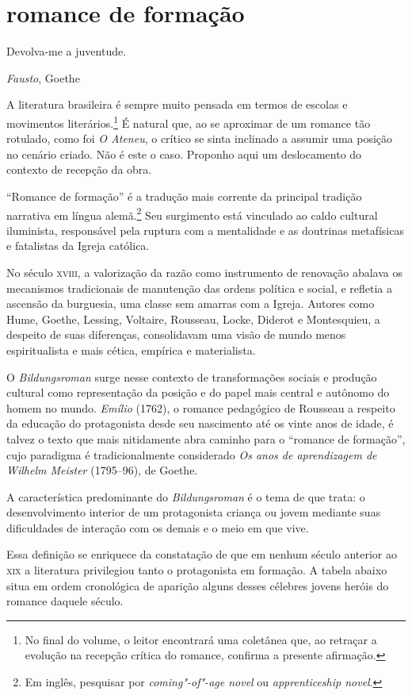 \section*{romance de formação}

\epigraph{Devolva-me a juventude.}{\textit{Fausto}, Goethe}

A literatura brasileira é sempre muito pensada em termos
de escolas e movimentos literários.\footnote{ No final do volume, o
leitor encontrará uma coletânea que, ao retraçar a evolução na recepção
crítica do romance, confirma a presente afirmação.} É
natural que, ao se aproximar de um romance tão rotulado, como foi
\textit{O Ateneu}, o crítico se sinta
inclinado a assumir uma posição no cenário criado. Não é este o caso.
Proponho aqui um deslocamento do contexto de recepção da obra.

``Romance de formação'' é a tradução mais corrente da
principal tradição narrativa em língua alemã.\footnote{Em inglês,
pesquisar por \textit{coming"-of"-age novel} ou
\textit{apprenticeship novel}.} Seu surgimento está
vinculado ao caldo cultural iluminista, responsável pela ruptura com a
mentalidade e as doutrinas metafísicas e fatalistas da Igreja católica.


No século \textsc{xviii}, a valorização da razão como instrumento de renovação
abalava os mecanismos tradicionais de manutenção das ordens política e
social, e refletia a ascensão da burguesia, uma classe sem amarras com
a Igreja. Autores como Hume, Goethe, Lessing, Voltaire, Rousseau,
Locke, Diderot e Montesquieu, a despeito de suas diferenças,
consolidavam uma visão de mundo menos espiritualista e mais cética,
empírica e materialista.


O \textit{Bildungsroman} surge nesse contexto de transformações sociais e produção cultural como
representação da posição e do papel mais central e autônomo do homem no
mundo. \textit{Emílio} (1762), o romance
pedagógico de Rousseau a respeito da educação do protagonista desde seu
nascimento até os vinte anos de idade, é talvez o texto que mais
nitidamente abra caminho para o ``romance de formação'', cujo paradigma é
tradicionalmente considerado \textit{Os anos de aprendizagem
de Wilhelm Meister} (1795--96), de Goethe.


A característica predominante do
\textit{Bildungsroman} é o tema de que
trata: o desenvolvimento interior de um protagonista criança ou jovem
mediante suas dificuldades de interação com os demais e o meio em que vive. 

Essa definição se enriquece da constatação de que em nenhum século
anterior ao \textsc{xix} a literatura privilegiou tanto o protagonista em
formação. A tabela abaixo situa em ordem cronológica de aparição alguns
desses célebres jovens heróis do romance daquele século.

